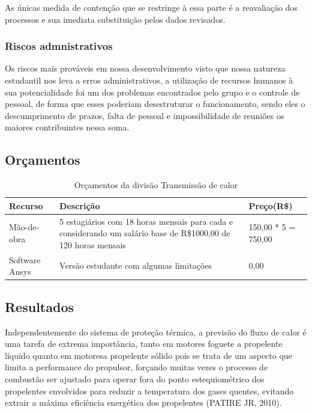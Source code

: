 As únicas medida de contenção que se restringe à essa parte é a reavaliação dos processos e sua imediata substituição pelos dados revisados.

\subsubsection{Riscos admnistrativos}

Os riscos mais prováveis em nossa desenvolvimento visto que nossa natureza estudantil nos leva a erros administrativos, a utilização de recursos humanos à sua potencialidade foi um dos problemas encontrados pelo grupo e o controle de pessoal, de forma que esses poderiam desestruturar o funcionamento, sendo eles o descumprimento de prazos, falta de pessoal e impossibilidade de reuniões os maiores contribuintes nessa soma.

\subsection {Orçamentos}

\begin{table}[htb]
\centering
\begin{tabular}{|p{3cm}|p{4cm}|p{3cm}|}
\hline
Recurso & Descrição & Preço(R\$) \\
\hline
Mão-de-obra & 5 estagiários com 18 horas mensais para cada e considerando um salário base de R\$1000,00 de 120 horas mensais & 150,00 * 5 = 750,00\\ \hline
Software Ansys & Versão estudante com algumas limitações & 0,00\\ \hline
\hline
\end{tabular}
\caption{Orçamentos da divisão Transmissão de calor}
\end{table}

\subsection{Resultados}

Independentemente do sistema de proteção térmica, a previsão do fluxo de calor é uma tarefa de extrema importância, tanto em motores foguete a propelente líquido quanto em motoresa propelente sólido pois se trata de um aspecto que limita a performance do propulsor, forçando muitas vezes o processo de combustão ser ajustado para operar fora do ponto estequiométrico dos propelentes envolvidos para reduzir a temperatura dos gases quentes, evitando extrair a máxima eficiência energética dos propelentes (PATIRE JR, 2010).

